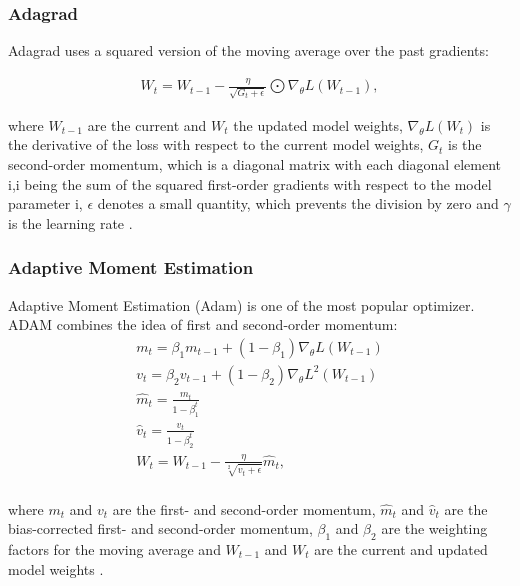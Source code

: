 \subsubsection{Adagrad}
Adagrad uses a squared version of the moving average over the past gradients:

\begin{equation}
    \begin{aligned}
    W_{t} = W_{t-1} - \frac{\eta}{\sqrt{G_{t}+ \epsilon}} \bigodot \nabla_{\theta}L(W_{t-1}),
    \end{aligned}
    \label{eq:Adagrad}
\end{equation}
    
where  $W_{t-1}$ are the current and $W_{t}$ the updated model weights, $\nabla_{\theta}L(W_{t})$ is the derivative of the loss with respect to the current model weights, $G_{t}$ is the second-order momentum, which is a diagonal matrix with each diagonal element i,i being the sum of the squared first-order gradients with respect to the model parameter i, $\epsilon$ denotes a small quantity, which prevents the division by zero and $\gamma$ is the learning rate \cite{Ruder2016}.


\subsubsection{Adaptive Moment Estimation}
Adaptive Moment Estimation (Adam) is one of the most popular optimizer. ADAM combines the idea of first and second-order momentum: 
\begin{equation}
    \begin{aligned}
    &m_{t} =  \beta_{1} m_{t-1} +  (1-\beta_{1}) \nabla_{\theta}L(W_{t-1}) &\\
    &v_{t} =  \beta_{2} v_{t-1} +  (1-\beta_{2}) \nabla_{\theta}L^{2}(W_{t-1}) &\\
    &\hat{m}_{t} = \frac{m_{t}}{1-\beta_{1}^{t}}&\\
    &\hat{v}_{t} = \frac{v_{t}}{1-\beta_{2}^{t}}&\\
    & W_{t} = W_{t-1} - \frac{\eta}{\sqrt[2]{\hat{v}_{t} + \epsilon}}\hat{m}_{t}, &\\
    \end{aligned}
    \label{eq:ADAM}
\end{equation}
    
where $m_{t}$ and $v_{t}$ are the first- and second-order momentum, $\hat{m}_{t}$ and $\hat{v}_{t}$ are the bias-corrected first- and second-order momentum, $\beta_{1}$ and $\beta_{2}$ are the weighting factors for the moving average and $W_{t-1}$ and  $W_{t}$ are the current and updated model weights \cite{Ruder2016}.

